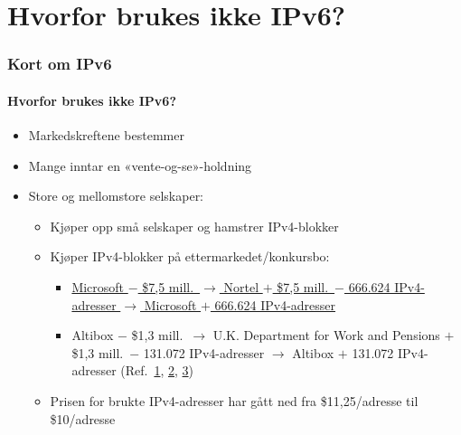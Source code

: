 \section{Hvorfor brukes ikke IPv6?}
\begin{frame}%
  \frametitle{Kort om IPv6}
  \framesubtitle{Hvorfor brukes ikke IPv6?}
  \pause
  \begin{itemize}[<+->]
  \item Markedskreftene bestemmer
  \item Mange inntar en «vente-og-se»-holdning
  \item Store og mellomstore selskaper:
    \begin{itemize}[<+->]
    \item Kjøper opp små selskaper og hamstrer IPv4-blokker
    \item Kjøper IPv4-blokker på ettermarkedet/konkursbo:
      \begin{itemize}[<+->]
      \item
        \href{http://www.computerworld.com/s/article/9215055/Microsoft_offers_7.5M_for_666_624_IPv4_addresses}{Microsoft
          \(-\) \$7,5 mill.\ \(\to\) Nortel \(+\) \$7,5 mill.\ \(-\) 666.624 IPv4-adresser \(\to\) Microsoft \(+\)
          666.624 IPv4-adresser}

      \item Altibox \(-\)
        \$1,3 mill.\ \(\to\)
        U.K. Department for Work and Pensions \(+\)
        \$1,3 mill.\ \(-\)
        131.072 IPv4-adresser \(\to\)
        Altibox \(+\) 131.072 IPv4-adresser
        (Ref.\
        \href{http://www.standard.difi.no/filearchive/samf-ok-analyse-ipv6-v0-8.pdf}{1},
        \href{http://www.digi.no/bedriftsteknologi/2015/05/26/altibox-kjoper-131.072-ip-adresser-fra-england}{2},
        \href{http://www.bbc.com/news/technology-32826353}{3})
      \end{itemize}
    \item Prisen for brukte IPv4-adresser har gått ned fra
      \$11,25/adresse til \$10/adresse
    \end{itemize}
  \end{itemize}
\end{frame}


